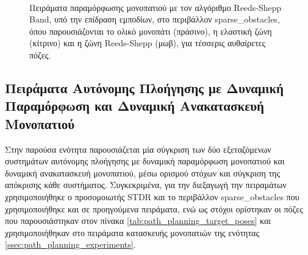 \begin{figure}[!ht]
	 \hspace{0.02\linewidth}
	  \hspace{0.02\linewidth}
	\\

	\caption{Πειράματα παραμόρφωσης μονοπατιού με τον αλγόριθμο Reeds-Shepp Band, υπό την επίδραση εμποδίων, στο περιβάλλον sparse{\_}obstacles, όπου παρουσιάζονται το ολικό μονοπάτι (πράσινο), η ελαστική ζώνη (κίτρινο) και η ζώνη Reeds-Shepp (μωβ), για τέσσερις αυθαίρετες πόζες.}
	\label{fig:sparse_obstacles_rsband}
\end{figure}


\subsection{Πειράματα Αυτόνομης Πλοήγησης με Δυναμική Παραμόρφωση και Δυναμική Ανακατασκευή Μονοπατιού} \label{navigation_systems_comparison}
Στην παρούσα ενότητα παρουσιάζεται μία σύγκριση των δύο εξεταζόμενων συστημάτων αυτόνομης πλοήγησης με δυναμική παραμόρφωση μονοπατιού και δυναμική ανακατασκευή μονοπατιού, μέσω ορισμού στόχων και σύγκριση της απόκρισης κάθε συστήματος. Συγκεκριμένα, για την διεξαγωγή την πειραμάτων χρησιμοποιήθηκε ο προσομοιωτής STDR και το περιβάλλον sparse{\_}obstacles που χρησιμοποιήθηκε και σε προηγούμενα πειράματα, ενώ ως στόχοι ορίστηκαν οι πόζες που παρουσιάστηκαν στον πίνακα \ref{tab:path_planning_target_poses} και χρησιμοποιήθηκαν στο πειράματα κατασκευής μονοπατιών της ενότητας \ref{ssec:path_planning_experiments}.


